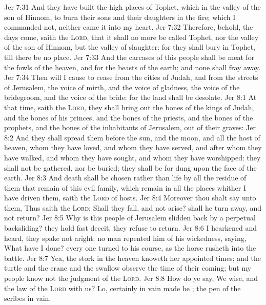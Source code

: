 \vs Jer 7:31 And they have built the high places of Tophet, which  in the valley of the son of Hinnom, to burn their sons and their daughters in the fire; which I commanded  not, neither came it into my heart.
\vs Jer 7:32 Therefore, behold, the days come, saith the \textsc{Lord}, that it shall no more be called Tophet, nor the valley of the son of Hinnom, but the valley of slaughter: for they shall bury in Tophet, till there be no place.
\vs Jer 7:33 And the carcases of this people shall be meat for the fowls of the heaven, and for the beasts of the earth; and none shall fray  away.
\vs Jer 7:34 Then will I cause to cease from the cities of Judah, and from the streets of Jerusalem, the voice of mirth, and the voice of gladness, the voice of the bridegroom, and the voice of the bride: for the land shall be desolate.
\vs Jer 8:1 At that time, saith the \textsc{Lord}, they shall bring out the bones of the kings of Judah, and the bones of his princes, and the bones of the priests, and the bones of the prophets, and the bones of the inhabitants of Jerusalem, out of their graves:
\vs Jer 8:2 And they shall spread them before the sun, and the moon, and all the host of heaven, whom they have loved, and whom they have served, and after whom they have walked, and whom they have sought, and whom they have worshipped: they shall not be gathered, nor be buried; they shall be for dung upon the face of the earth.
\vs Jer 8:3 And death shall be chosen rather than life by all the residue of them that remain of this evil family, which remain in all the places whither I have driven them, saith the \textsc{Lord} of hosts.
\vs Jer 8:4 Moreover thou shalt say unto them, Thus saith the \textsc{Lord}; Shall they fall, and not arise? shall he turn away, and not return?
\vs Jer 8:5 Why  is this people of Jerusalem slidden back by a perpetual backsliding? they hold fast deceit, they refuse to return.
\vs Jer 8:6 I hearkened and heard,  they spake not aright: no man repented him of his wickedness, saying, What have I done? every one turned to his course, as the horse rusheth into the battle.
\vs Jer 8:7 Yea, the stork in the heaven knoweth her appointed times; and the turtle and the crane and the swallow observe the time of their coming; but my people know not the judgment of the \textsc{Lord}.
\vs Jer 8:8 How do ye say, We  wise, and the law of the \textsc{Lord}  with us? Lo, certainly in vain made he ; the pen of the scribes  in vain.
